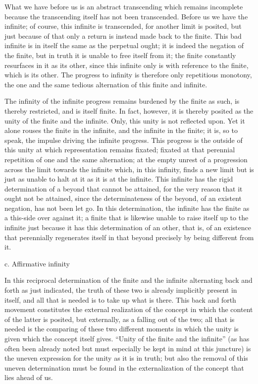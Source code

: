 What we have before us is an abstract transcending
which remains incomplete because the transcending
itself has not been transcended.
Before us we have the infinite;
of course, this infinite is transcended,
for another limit is posited,
but just because of that only a return
is instead made back to the finite.
This bad infinite is in itself
the same as the perpetual ought;
it is indeed the negation of the finite,
but in truth it is unable to free itself from it;
the finite constantly resurfaces in it as its other,
since this infinite only is with reference to the finite,
which is its other.
The progress to infinity is
therefore only repetitious monotony,
the one and the same tedious
alternation of this finite and infinite.

The infinity of the infinite progress
remains burdened by the finite as such,
is thereby restricted, and is itself finite.
In fact, however, it is thereby posited as
the unity of the finite and the infinite.
Only, this unity is not reflected upon.
Yet it alone rouses the finite in the infinite,
and the infinite in the finite;
it is, so to speak, the impulse
driving the infinite progress.
This progress is the outside of this unity
at which representation remains fixated;
fixated at that perennial repetition
of one and the same alternation;
at the empty unrest of a progression
across the limit towards the infinite
which, in this infinity, finds a new limit
but is just as unable to halt at it
as it is at the infinite.
This infinite has the rigid determination
of a beyond that cannot be attained,
for the very reason that it ought not be attained,
since the determinateness of the beyond,
of an existent negation, has not been let go.
In this determination, the infinite has
the finite as a this-side over against it;
a finite that is likewise unable
to raise itself up to the infinite
just because it has this determination of an other,
that is, of an existence that perennially regenerates itself
in that beyond  precisely by being different from it.

c. Affirmative infinity

In this reciprocal determination of the finite and the infinite
alternating back and forth as just indicated,
the truth of these two is already implicitly present in itself,
and all that is needed is to take up what is there.
This back and forth movement constitutes the external realization
of the concept in which the content of the latter is posited,
but externally, as a falling out of the two;
all that is needed is the comparing of these two different moments
in which the unity is given which the concept itself gives.
“Unity of the finite and the infinite”
(as has often been already noted
but must especially be kept in mind at this juncture)
is the uneven expression for the unity as it is in truth;
but also the removal of this uneven determination must be
found in the externalization of the concept that lies ahead of us.


